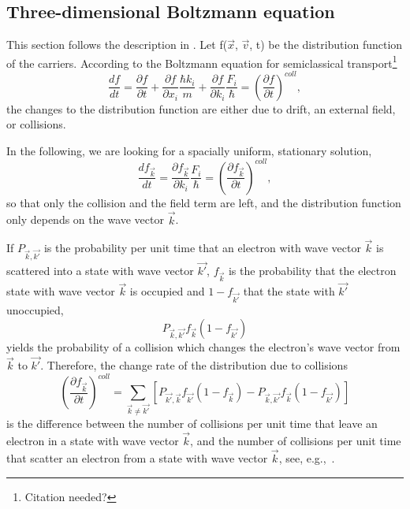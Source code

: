 \documentclass[physics,phd,nolot,nolof]{uccthesis}%
\begin{document}
{%
\subsection{Three-dimensional Boltzmann equation}
This section follows the description in \cite{RID99}.
Let f($\vec x$, $\vec v$, t) be the distribution function of the carriers.
According to the Boltzmann equation for semiclassical transport\footnote{Citation needed?}
\begin{equation}
  \frac{d f}{d t}=\frac{\partial f}{\partial t} +\frac{\partial f}{\partial x_i}\frac{\hbar k_i}{m}+\frac{\partial f}{\partial k_i}\frac{F_i}{\hbar}=\left(\frac{\partial f}{\partial t}\right)^{coll},
  \label{eq:Boltzmann}
\end{equation}
the changes to the distribution function are either due to drift, an external field, or collisions.

In the following, we are looking for a spacially uniform, stationary solution,\begin{equation}
  \frac{d f_{\vec k}}{d t}
  =\frac{\partial f_{\vec k}}{\partial k_i}\frac{F_i}{\hbar}
  =\left(\frac{\partial f_{\vec k}}{\partial t}\right)^{coll},
  \label{eq:Boltzmanneqstationaryuniform}
\end{equation}
so that only the collision and the field term are left, and the distribution function only depends on the wave vector $\vec k$. 

If $P_{\vec k,\vec{k'}}$ is the probability per unit time that an electron with wave vector $\vec k$ is scattered into a state with wave vector $\vec{k'}$,
$f_{\vec{k}}$ is the probability that the electron state with wave vector $\vec k$ is occupied and $1-f_{\vec{k'}}$ that the state with $\vec{k'}$ unoccupied, 
\[
P_{\vec k,\vec{k'}}f_{\vec k}(1-f_{\vec{k'}})
\]
yields the probability of a collision which changes the electron's wave vector from $\vec{k}$ to $\vec{k'}$. Therefore, the change rate of the distribution due to collisions 
\begin{equation}
  \left(\frac{\partial f_{\vec{k}}}{\partial t}\right)^{coll}
  =\sum\limits_{\vec{k}\neq\vec{k'}}
  \left[P_{\vec{ k'},\vec{k}}f_{\vec{k'}}(1-f_{\vec{k}})-P_{\vec k,\vec{k'}}f_{\vec k}(1-f_{\vec{k'}})\right]
  \label{eq:collisionterm}
\end{equation}
is the difference between the number of collisions per unit time that leave an electron in a state with wave vector $\vec k$, and the number of collisions per unit time that scatter an electron from a state with wave vector $\vec{k}$, see, e.g.,~\cite{asc87}.
}
\end{document}
